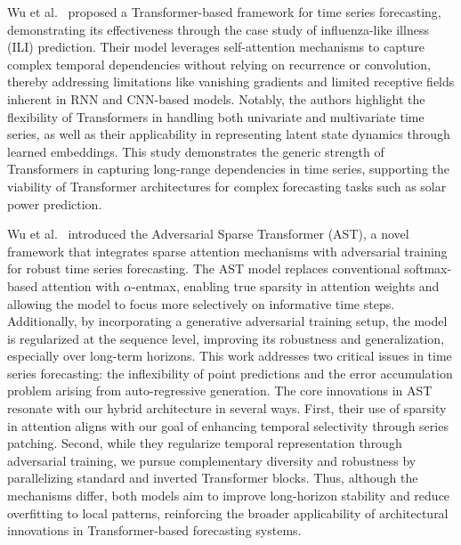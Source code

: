 \documentclass[12pt]{uomthesis}
\begin{document}
Wu et al.~\cite{wu2020deep} proposed a Transformer-based framework for time series forecasting, demonstrating its effectiveness through the case study of influenza-like illness (ILI) prediction. Their model leverages self-attention mechanisms to capture complex temporal dependencies without relying on recurrence or convolution, thereby addressing limitations like vanishing gradients and limited receptive fields inherent in RNN and CNN-based models. Notably, the authors highlight the flexibility of Transformers in handling both univariate and multivariate time series, as well as their applicability in representing latent state dynamics through learned embeddings. This study demonstrates the generic strength of Transformers in capturing long-range dependencies in time series, supporting the viability of Transformer architectures for complex forecasting tasks such as solar power prediction.

Wu et al.~\cite{wu2020adversarial} introduced the Adversarial Sparse Transformer (AST), a novel framework that integrates sparse attention mechanisms with adversarial training for robust time series forecasting. The AST model replaces conventional softmax-based attention with $\alpha$-entmax, enabling true sparsity in attention weights and allowing the model to focus more selectively on informative time steps. Additionally, by incorporating a generative adversarial training setup, the model is regularized at the sequence level, improving its robustness and generalization, especially over long-term horizons. This work addresses two critical issues in time series forecasting: the inflexibility of point predictions and the error accumulation problem arising from auto-regressive generation. The core innovations in AST resonate with our hybrid architecture in several ways. First, their use of sparsity in attention aligns with our goal of enhancing temporal selectivity through series patching. Second, while they regularize temporal representation through adversarial training, we pursue complementary diversity and robustness by parallelizing standard and inverted Transformer blocks. Thus, although the mechanisms differ, both models aim to improve long-horizon stability and reduce overfitting to local patterns, reinforcing the broader applicability of architectural innovations in Transformer-based forecasting systems.
\end{document}
